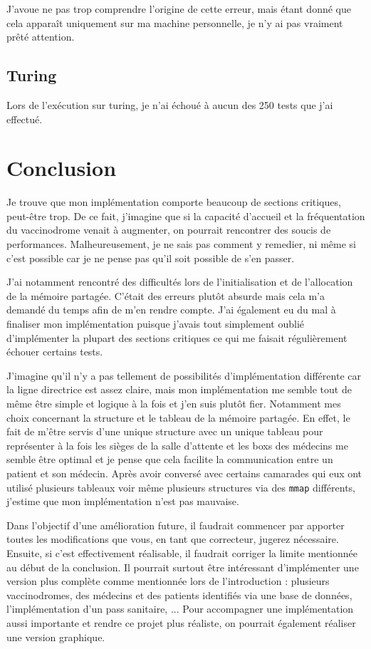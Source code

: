 \documentclass[a4paper]{article}
\begin{document}
J'avoue ne pas trop comprendre l'origine de cette erreur, mais étant donné que cela apparaît uniquement sur ma machine personnelle, je n'y ai pas vraiment prêté attention.

\subsection{Turing}

Lors de l'exécution sur turing, je n'ai échoué à aucun des 250 tests que j'ai effectué.

\newpage
\section{Conclusion}

Je trouve que mon implémentation comporte beaucoup de sections critiques, peut-être trop. De ce fait, j'imagine que si la capacité d'accueil et la fréquentation du vaccinodrome venait à augmenter, on pourrait rencontrer des soucis de performances. Malheureusement, je ne sais pas comment y remedier, ni même si c'est possible car je ne pense pas qu'il soit possible de s'en passer.
\bigskip \par J'ai notamment rencontré des difficultés lors de l'initialisation et de l'allocation de la mémoire partagée. C'était des erreurs plutôt absurde mais cela m'a demandé du temps afin de m'en rendre compte. J'ai également eu du mal à finaliser mon implémentation puisque j'avais tout simplement oublié d'implémenter la plupart des sections critiques ce qui me faisait régulièrement échouer certains tests.
\bigskip \par J'imagine qu'il n'y a pas tellement de possibilités d'implémentation différente car la ligne directrice est assez claire, mais mon implémentation me semble tout de même être simple et logique à la fois et j'en suis plutôt fier. Notamment mes choix concernant la structure et le tableau de la mémoire partagée. En effet, le fait de m'être servis d'une unique structure avec un unique tableau pour représenter à la fois les sièges de la salle d'attente et les boxs des médecins me semble être optimal et je pense que cela facilite la communication entre un patient et son médecin. Après avoir conversé avec certains camarades qui eux ont utilisé plusieurs tableaux voir même plusieurs structures via des \texttt{mmap} différents, j'estime que mon implémentation n'est pas mauvaise.
\bigskip \par Dans l'objectif d'une amélioration future, il faudrait commencer par apporter toutes les modifications que vous, en tant que correcteur, jugerez nécessaire. Ensuite, si c'est effectivement réalisable, il faudrait corriger la limite mentionnée au début de la conclusion. Il pourrait surtout être intéressant d'implémenter une version plus complète comme mentionnée lors de l'introduction : plusieurs vaccinodromes, des médecins et des patients identifiés via une base de données, l'implémentation d'un pass sanitaire, ... Pour accompagner une implémentation aussi importante et rendre ce projet plus réaliste, on pourrait également réaliser une version graphique.
\end{document}
